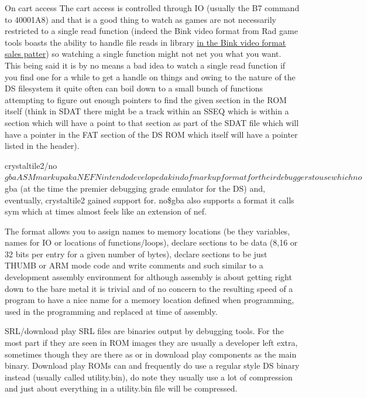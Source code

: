 \documentclass[
]{book}
\begin{document}
On cart access The cart access is controlled through IO (usually the B7 command to 40001A8) and that is a good thing to watch as games are not necessarily restricted to a single read function (indeed the Bink video format from Rad game tools boasts the ability to handle file reads in library \href{http://www.radgametools.com/binksdk.htm}{in the Bink video format sales patter}) so watching a single function might not net you what you want. This being said it is by no means a bad idea to watch a single read function if you find one for a while to get a handle on things and owing to the nature of the DS filesystem it quite often can boil down to a small bunch of functions attempting to figure out enough pointers to find the given section in the ROM itself (think in SDAT there might be a track within an SSEQ which is within a section which will have a point to that section as part of the SDAT file which will have a pointer in the FAT section of the DS ROM which itself will have a pointer listed in the header).

crystaltile2/no\(gba ASM markup aka NEF Nintendo developed a kind of markup format for their debuggers to use which no\)gba (at the time the premier debugging grade emulator for the DS) and, eventually, crystaltile2 gained support for. no\$gba also supports a format it calls sym which at times almost feels like an extension of nef.

The format allows you to assign names to memory locations (be they variables, names for IO or locations of functions/loops), declare sections to be data (8,16 or 32 bits per entry for a given number of bytes), declare sections to be just THUMB or ARM mode code and write comments and such similar to a development assembly environment for although assembly is about getting right down to the bare metal it is trivial and of no concern to the resulting speed of a program to have a nice name for a memory location defined when programming, used in the programming and replaced at time of assembly.

SRL/download play SRL files are binaries output by debugging tools. For the most part if they are seen in ROM images they are usually a developer left extra, sometimes though they are there as or in download play components as the main binary. Download play ROMs can and frequently do use a regular style DS binary instead (usually called utility.bin), do note they usually use a lot of compression and just about everything in a utility.bin file will be compressed.
\end{document}
